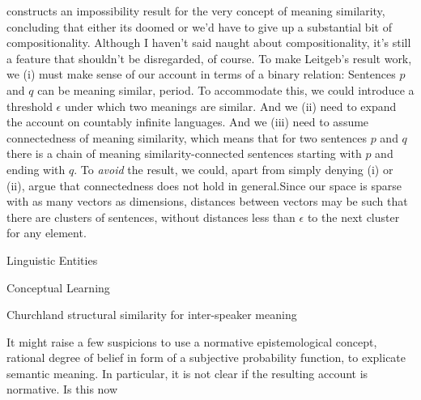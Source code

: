 \documentclass[11pt, a4paper]{scrartcl}
\renewcommand{\i}[1]{\emph{#1}}
\begin{document}
\textcite{Leitgeb2008-LEIAIR} constructs an impossibility result for the very concept of meaning similarity, concluding that either its doomed or we'd have to give up a substantial bit of compositionality. Although I haven't said naught about compositionality, it's still a feature that shouldn't be disregarded, of course. To make Leitgeb's result work, we (i) must make sense of our account in terms of a binary relation: Sentences $p$ and $q$ can be meaning similar, period. To accommodate this, we could introduce a threshold $\epsilon$ under which two meanings are similar. And we (ii) need to expand the account on countably infinite languages. And we (iii) need to assume connectedness of meaning similarity, which means that for two sentences $p$ and $q$ there is a chain of meaning similarity-connected sentences starting with $p$ and ending with $q$. To \i{avoid} the result, we could, apart from simply denying (i) or (ii), argue that connectedness does not hold in general.Since our space is sparse with as many vectors as dimensions, distances between vectors may be such that there are clusters of sentences, without distances less than $\epsilon$ to the next cluster for any element.

Linguistic Entities

Conceptual Learning

Churchland structural similarity for inter-speaker meaning

It might raise a few suspicions to use a normative epistemological concept, rational degree of belief in form of a subjective probability function, to explicate semantic meaning. In particular, it is not clear if the resulting account is normative. Is this now

\begin{singlespacing}
\printbibliography{}
\end{singlespacing}
\end{document}
